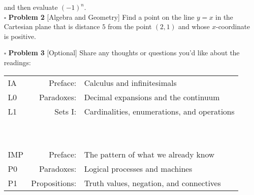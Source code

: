 \documentclass[11pt]{article}
\numberwithin{equation}{section}
\begin{document}
 \noindent and then evaluate $(-1)^n$.\\
$ \ $\\
$ \ $\\
    \noindent $\square$ \textbf{Problem 2} \textsf{[Algebra and Geometry]} Find a point on the line $y = x$ in the Cartesian plane that is distance $5$ from the point $(2,1)$ and whose $x$-coordinate is positive.

 $ \ $\\
 
 \noindent $\square$ \textbf{Problem 3} \textsf{[Optional]} Share any thoughts or questions you'd like about the readings:
 {
 \begin{center}
 \begin{tabular}{ l r l }
\textsf{IA} & Preface: & Calculus and infinitesimals \\ 
\textsf{L0} & Paradoxes: & Decimal expansions and the continuum \\
\textsf{L1} & Sets I: & Cardinalities, enumerations, and operations \\
\ & \ & \\
\hline
\ & \ & \\

 \textsf{IMP} & Preface: & The pattern of what we already know\\
\textsf{P0} & Paradoxes: & Logical processes and machines\\
\textsf{P1}  &  Propositions: & Truth values, negation, and connectives
\end{tabular} \end{center}}

 
 
 
\end{document}
